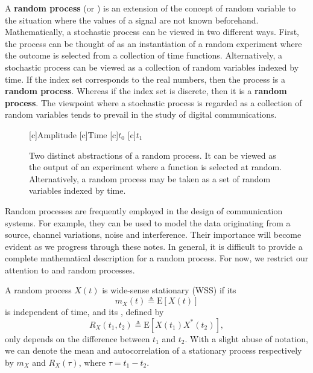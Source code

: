 A \textbf{random process} (or ) is an extension of the concept of random variable to the situation where the values of a signal are not known beforehand.
Mathematically, a stochastic process can be viewed in two different ways.
First, the process can be thought of as an instantiation of a random experiment where the outcome is selected from a collection of time functions.
Alternatively, a stochastic process can be viewed as a collection of random variables indexed by time.
If the index set corresponds to the real numbers, then the process is a  \textbf{random process}.
Whereas if the index set is discrete, then it is a  \textbf{random process}.
The viewpoint where a stochastic process is regarded as a collection of random variables tends to prevail in the study of digital communications.
\begin{figure}[htbp]
\begin{center}
\begin{psfrags}
[c]{Amplitude}
[c]{Time}
[c]{$t_0$}
[c]{$t_1$}
\end{psfrags}
\caption{Two distinct abstractions of a random process.
It can be viewed as the output of an experiment where a function is selected at random.
Alternatively, a random process may be taken as a set of random variables indexed by time.}
\label{figure:RandomProcess}
\end{center}
\end{figure}

Random processes are frequently employed in the design of communication systems.
For example, they can be used to model the data originating from a source, channel variations, noise and interference.
Their importance will become evident as we progress through these notes.
In general, it is difficult to provide a complete mathematical description for a random process.
For now, we restrict our attention to  and  random processes.

\begin{definition}[Stationarity]
A random process $X(t)$ is wide-sense stationary (WSS) if its 
\begin{equation*}
m_X(t) \triangleq \mathrm{E} [X(t)]
\end{equation*}
is independent of time, and its , defined by
\begin{equation*}
R_X(t_1, t_2) \triangleq \mathrm{E} [X(t_1) X^*(t_2)],
\end{equation*}
only depends on the difference between $t_1$ and $t_2$.
With a slight abuse of notation, we can denote the mean and autocorrelation of a stationary process respectively by $m_X$ and $R_X(\tau)$, where $\tau = t_1 - t_2$.
\end{definition}

